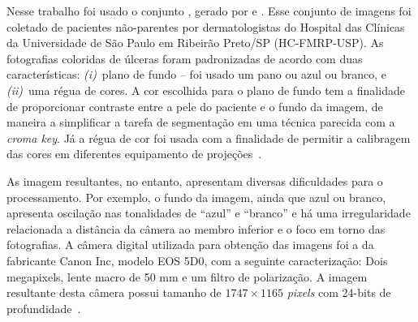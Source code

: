 Nesse trabalho foi usado o conjunto \dataset, gerado por  e .
Esse conjunto de imagens foi coletado de pacientes não-parentes por dermatologistas do Hospital das Clínicas da Universidade de São Paulo em Ribeirão Preto/SP (HC-FMRP-USP).
As fotografias coloridas de úlceras foram padronizadas de acordo com duas características: 
\textit{(i)}~plano de fundo -- foi usado um pano ou azul ou branco, e 
\textit{(ii)}~uma régua de cores.
A cor escolhida para o plano de fundo tem a finalidade de proporcionar contraste entre a pele do paciente e o fundo da imagem, de maneira a simplificar a tarefa de segmentação em uma técnica parecida com a \textit{croma key}.
Já a régua de cor foi usada com a finalidade de permitir a calibragem das cores em diferentes equipamento de projeções~\cite{Pereira2011}.

As imagem resultantes, no entanto, apresentam diversas dificuldades para o processamento.
Por exemplo, o fundo da imagem, ainda que azul ou branco, apresenta oscilação nas tonalidades de ``azul'' e ``branco'' e há uma irregularidade relacionada a distância da câmera ao membro inferior e o foco em torno das fotografias.
A câmera digital utilizada para obtenção das imagens foi a da fabricante Canon Inc, modelo  EOS 5D0, com a seguinte caracterização: Dois megapixels, lente macro de 50 mm e um filtro de polarização. 
A imagem resultante desta câmera possui tamanho de $1747\times1165$ \textit{pixels} com 24-bits de profundidade~\cite{Dorileo2008}.\\
